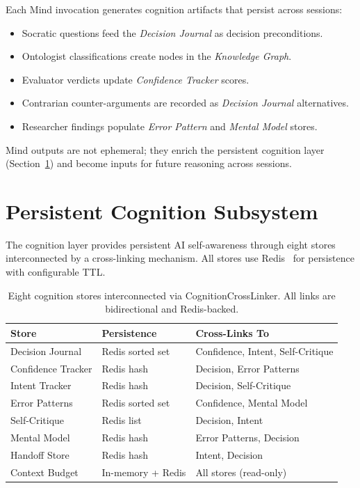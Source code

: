 \documentclass[journal,10pt]{IEEEtran}
\begin{document}
Each Mind invocation generates cognition artifacts that persist across sessions:

\begin{itemize}[nosep]
\item Socratic questions feed the \emph{Decision Journal} as decision preconditions.
\item Ontologist classifications create nodes in the \emph{Knowledge Graph}.
\item Evaluator verdicts update \emph{Confidence Tracker} scores.
\item Contrarian counter-arguments are recorded as \emph{Decision Journal} alternatives.
\item Researcher findings populate \emph{Error Pattern} and \emph{Mental Model} stores.
\end{itemize}

Mind outputs are not ephemeral; they enrich the persistent cognition layer (Section~\ref{sec:cognition}) and become inputs for future reasoning across sessions.

\section{Persistent Cognition Subsystem}
\label{sec:cognition}

The cognition layer provides persistent AI self-awareness through eight stores interconnected by a cross-linking mechanism. All stores use Redis~\cite{redis} for persistence with configurable TTL.

\begin{table}[!t]
\caption{Eight cognition stores interconnected via CognitionCrossLinker. All links are bidirectional and Redis-backed.}
\label{tab:cognition}
\centering\small
\begin{tabular}{@{}lll@{}}
\toprule
\textbf{Store} & \textbf{Persistence} & \textbf{Cross-Links To} \\
\midrule
Decision Journal    & Redis sorted set  & Confidence, Intent, Self-Critique \\
Confidence Tracker  & Redis hash        & Decision, Error Patterns \\
Intent Tracker      & Redis hash        & Decision, Self-Critique \\
Error Patterns      & Redis sorted set  & Confidence, Mental Model \\
Self-Critique       & Redis list        & Decision, Intent \\
Mental Model        & Redis hash        & Error Patterns, Decision \\
Handoff Store       & Redis hash        & Intent, Decision \\
Context Budget      & In-memory + Redis & All stores (read-only) \\
\bottomrule
\end{tabular}
\end{table}
\end{document}
